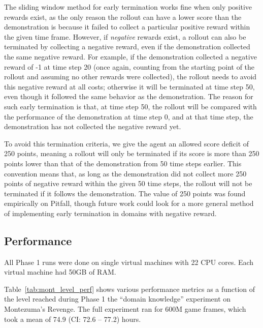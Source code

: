 \documentclass{article}
\newcommand{\pivotci}[2]{(CI: #1 -- #2)}  \newcommand{\percci}[2]{}  \newcommand{\tpivotci}[2]{(#1 -- #2)}  \newcommand{\tpercci}[2]{}  \newcommand{\na}[0]{-}
\begin{document}
The sliding window method for early termination works fine when only positive rewards exist, as the only reason the rollout can have a lower score than the demonstration is because it failed to collect a particular positive reward within the given time frame. However, if \emph{negative} rewards exist, a rollout can also be terminated by collecting a negative reward, even if the demonstration collected the same negative reward. For example, if the demonstration collected a negative reward of -1 at time step 20 (once again, counting from the starting point of the rollout and assuming no other rewards were collected), the rollout needs to avoid this negative reward at all costs; otherwise it will be terminated at time step 50, even though it followed the same behavior as the demonstration. The reason for such early termination is that, at time step 50, the rollout will be compared with the performance of the demonstration at time step 0, and at that time step, the demonstration has not collected the negative reward yet.

To avoid this termination criteria, we give the agent an allowed score deficit of 250 points, meaning a rollout will only be terminated if its score is more than 250 points lower than that of the demonstration from 50 time steps earlier. This convention means that, as long as the demonstration did not collect more 250 points of negative reward within the given 50 time steps, the rollout will not be terminated if it follows the demonstration. The value of 250 points was found empirically on Pitfall, though future work could look for a more general method of implementing early termination in domains with negative reward.

\subsection{Performance}
\label{sec:performance}

\FloatBarrier

All Phase 1 runs were done on single virtual machines with 22 CPU cores. Each virtual machine had 50GB of RAM.

Table~\ref{tab:mont_level_perf} shows various performance metrics as a function of the level reached during Phase 1 the ``domain knowledge'' experiment on Montezuma's Revenge. The full experiment ran for 600M game frames, which took a mean of 74.9 \pivotci{72.6}{77.2}\percci{72.5}{77.2} hours.
\end{document}

